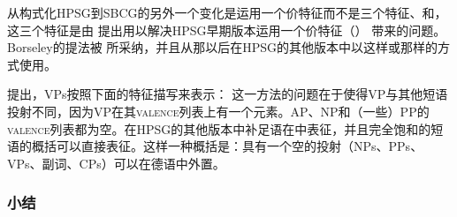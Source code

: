 从构式化HPSG到SBCG的另外一个变化是运用一个价特征而不是三个特征\sprc、\subjc 和\compsc，这三个特征是由 \citet{Borsley87}提出用以解决HPSG早期版本运用一个价特征（\subcatc） 带来的问题。Borseley的提法被 \citet[\S~9]{ps2}所采纳，并且从那以后在HPSG的其他版本中以这样或那样的方式使用。

 \citet[]{Sag2012a}提出，VPs按照下面的特征描写来表示：
\ea
{}
\z
这一方法的问题在于使得VP与其他短语投射不同，因为VP在其\textsc{valence}列表上有一个元素。AP、NP和（一些）PP的\textsc{valence}列表都为空。在HPSG的其他版本中补足语在\compslc 中表征，并且\compslc 完全饱和的短语的概括可以直接表征。这样一种概括是：具有一个空\compslc 的投射（NPs、PPs、VPs、副词、CPs）可以在德语中外置\citep[\S~13.1.2]{Mueller99a}。

\subsubsection{小结}

